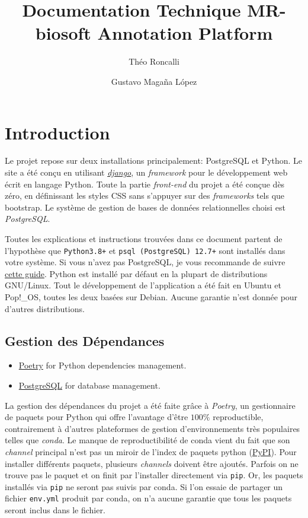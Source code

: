\documentclass[
  openany]{book}
\title{Documentation Technique MR-biosoft Annotation Platform}
\author{Théo Roncalli \and Gustavo Magaña López}
\date{}
\providecommand{\tightlist}{%
  \setlength{\itemsep}{0pt}\setlength{\parskip}{0pt}}
\begin{document}
\maketitle

{
\setcounter{tocdepth}{1}
\tableofcontents
}
\hypertarget{intro}{%
\chapter*{Introduction}\label{intro}}

Le projet repose sur deux installations principalement: PostgreSQL et Python.
Le site a été conçu en utilisant \href{https://www.djangoproject.com/}{\emph{django}}, un
\emph{framework} pour le développement web écrit en langage Python. Toute la partie
\emph{front-end} du projet a été conçue dès zéro, en définissant les styles CSS
sans s'appuyer sur des \emph{frameworks} tels que bootstrap. Le système de gestion
de bases de données relationnelles choisi est \emph{PostgreSQL}.

Toutes les explications et instructions trouvées dans ce document
partent de l'hypothèse que \texttt{Python3.8+} et \texttt{psql\ (PostgreSQL)\ 12.7+} sont
installés dans votre système. Si vous n'avez pas PostgreSQL, je vous
recommande de suivre
\href{https://www.lri.fr/~schevalier/doc/teaching/tutoriels/PostgreSQL_install.html}{cette guide}.
Python est installé par défaut en la plupart
de distributions GNU/Linux. Tout le développement de l'application a été fait
en Ubuntu et Pop!\_OS, toutes les deux basées sur Debian. Aucune garantie n'est
donnée pour d'autres distributions.

\hypertarget{deps}{%
\section*{Gestion des Dépendances}\label{deps}}

\begin{itemize}
\tightlist
\item
  \href{https://python-poetry.org/}{Poetry} for Python dependencies management.
\item
  \href{https://www.postgresql.org/}{PostgreSQL} for database management.
\end{itemize}

La gestion des dépendances du projet a été faite grâce à \emph{Poetry}, un gestionnaire
de paquets pour Python qui offre l'avantage d'être \(100\%\) reproductible,
contrairement à d'autres plateformes de gestion d'environnements très populaires
telles que \emph{conda}. Le manque de reproductibilité de conda vient du fait que son
\emph{channel} principal n'est pas un miroir de l'index de paquets python (\href{https://pypi.org/}{PyPI}).
Pour installer différents paquets, plusieurs \emph{channels} doivent être ajoutés.
Parfois on ne trouve pas le paquet et on finit par l'installer directement via \texttt{pip}.
Or, les paquets installés via \texttt{pip} ne seront pas suivis par conda. Si l'on essaie
de partager un fichier \texttt{env.yml} produit par conda, on n'a aucune garantie que tous
les paquets seront inclus dans le fichier.
\end{document}
